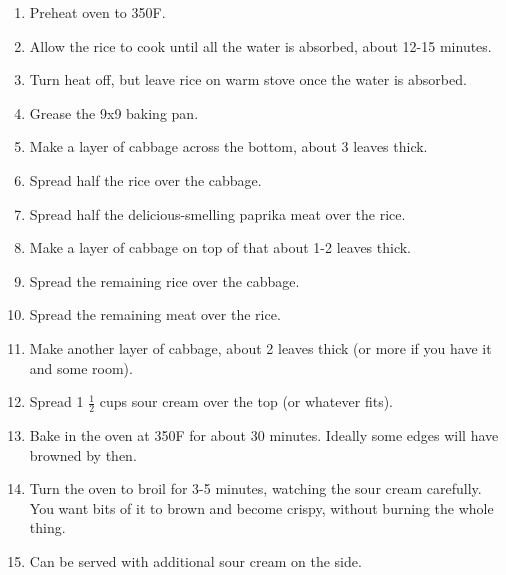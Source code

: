 \begin{multicols}{2}
\begin{enumerate}
    \item Preheat oven to 350F.
    \item Allow the rice to cook until all the water is absorbed, about 12-15 minutes.
    \item Turn heat off, but leave rice on warm stove once the water is absorbed.
    \item Grease the 9x9 baking pan.
    \item Make a layer of cabbage across the bottom, about 3 leaves thick.
    \item Spread half the rice over the cabbage.
    \item Spread half the delicious-smelling paprika meat over the rice.
    \item Make a layer of cabbage on top of that about 1-2 leaves thick.
    \item Spread the remaining rice over the cabbage.
    \item Spread the remaining meat over the rice.
    \item Make another layer of cabbage, about 2 leaves thick (or more if you have it and some room).
    \item Spread 1 \( \frac{1}{2} \) cups sour cream over the top (or whatever fits).
    \item Bake in the oven at 350F for about 30 minutes. Ideally some edges will have browned by then.
    \item Turn the oven to broil for 3-5 minutes, watching the sour cream carefully. You want bits of it to brown and become crispy, without burning the whole thing.
    \item Can be served with additional sour cream on the side.

\end{enumerate}


\end{multicols}
